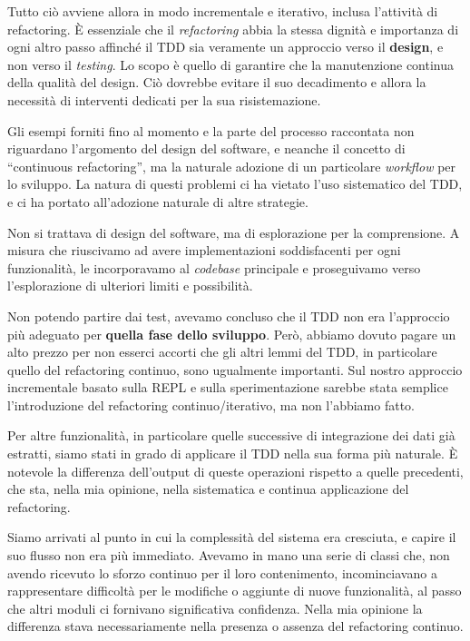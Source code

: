 \documentclass[12pt]{report}
\begin{document}
Tutto ciò avviene allora in modo incrementale e iterativo, inclusa 
l'attività di refactoring. È essenziale che il \textit{refactoring} 
abbia la stessa dignità e importanza di ogni altro passo affinché il 
TDD sia veramente un approccio verso il \textbf{design}, e non verso 
il \textit{testing}. Lo scopo è quello di garantire che la manutenzione 
continua della qualità del design. Ciò dovrebbe evitare il suo decadimento
e allora la necessità di interventi dedicati per la sua risistemazione.

Gli esempi forniti fino al momento e la parte del processo raccontata
non riguardano l'argomento del design del software, e neanche il concetto
di ``continuous refactoring'', ma la naturale adozione di un particolare 
\textit{workflow} per lo sviluppo. La natura di questi problemi ci ha 
vietato l'uso sistematico del TDD, e ci ha portato all'adozione naturale 
di altre strategie. 

Non si trattava di design del software, ma di esplorazione per la 
comprensione. A misura che riuscivamo ad avere implementazioni 
soddisfacenti per ogni funzionalità, le incorporavamo al \textit{codebase}
principale e proseguivamo verso l'esplorazione di ulteriori limiti 
e possibilità.

Non potendo partire dai test, avevamo concluso che il TDD non era
l'approccio più adeguato per \textbf{quella fase dello sviluppo}. 
Però, abbiamo dovuto pagare un alto prezzo per non esserci accorti 
che gli altri lemmi del TDD, in particolare quello del refactoring 
continuo, sono ugualmente importanti. Sul nostro approccio incrementale 
basato sulla REPL e sulla sperimentazione sarebbe stata semplice 
l'introduzione del refactoring continuo/iterativo,
ma non l'abbiamo fatto.

Per altre funzionalità, in particolare quelle successive di integrazione 
dei dati già estratti, siamo stati in grado di applicare il TDD nella 
sua forma più naturale. È notevole la differenza dell'output di 
queste operazioni rispetto a quelle precedenti, che sta, nella 
mia opinione, nella sistematica e continua applicazione del refactoring.

Siamo arrivati al punto in cui la complessità del sistema era 
cresciuta, e capire il suo flusso non era più immediato. Avevamo 
in mano una serie di classi che, non avendo ricevuto lo sforzo 
continuo per il loro contenimento, incominciavano a rappresentare 
difficoltà per le modifiche o aggiunte di nuove funzionalità, al 
passo che altri moduli ci fornivano significativa confidenza. Nella 
mia opinione la differenza stava necessariamente nella presenza o 
assenza del refactoring continuo.
\end{document}
